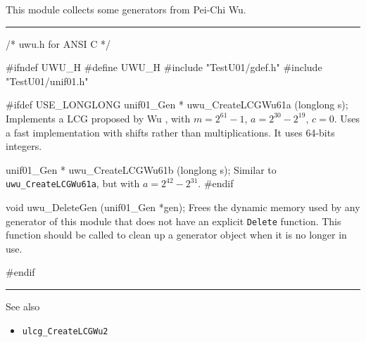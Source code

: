 
This module collects some generators from Pei-Chi Wu.


\bigskip
\hrule
\code\hide
/* uwu.h for ANSI C */

#ifndef UWU_H
#define UWU_H
\endhide
#include "TestU01/gdef.h"
#include "TestU01/unif01.h"


#ifdef USE_LONGLONG
   unif01_Gen * uwu_CreateLCGWu61a (longlong s);
\endcode
  \tab  Implements a LCG proposed by Wu \cite{rWU97a},
  with $m= 2^{61}-1$, $a = 2^{30} - 2^{19}$, $c=0$.
  Uses a fast implementation with shifts rather than
  multiplications.  
  It uses 64-bits integers. %
 \endtab
\code


   unif01_Gen * uwu_CreateLCGWu61b (longlong s);
\endcode
  \tab   Similar to {\tt uwu\_CreateLCGWu61a},
   but with  $a = 2^{42} - 2^{31}$. 
 \endtab
\code
#endif
\endcode




\code


void uwu_DeleteGen (unif01_Gen *gen);
\endcode
 \tab Frees the dynamic memory used by any generator of this module
  that does not have an explicit {\tt Delete} function. 
  This function should be called to clean up a generator object
  when it is no longer in use.
 \endtab
\code

\hide
#endif
\endhide
\endcode


\bigskip
\hrule
\bigskip

{
See also
\bigskip

\setlength{\partopsep}{0pt}
\setlength{\parskip}{0pt}
\setlength{\topsep}{0pt}
\setlength{\itemsep}{0pt}

\begin{itemize}
\item {\tt ulcg\_CreateLCGWu2}
\end{itemize}
}
